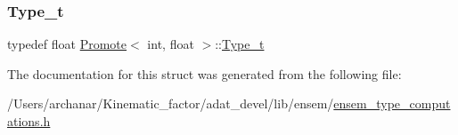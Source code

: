 \subsubsection{\texorpdfstring{Type\_t}{Type\_t}\hspace{0.1cm}{\footnotesize\ttfamily [2/2]}}
{\footnotesize\ttfamily typedef float \mbox{\hyperlink{structPromote}{Promote}}$<$ int, float $>$\+::\mbox{\hyperlink{structPromote_3_01int_00_01float_01_4_a368c812e2854d25d70464511b524bd9e}{Type\+\_\+t}}}



The documentation for this struct was generated from the following file\+:\begin{DoxyCompactItemize}
\item 
/\+Users/archanar/\+Kinematic\+\_\+factor/adat\+\_\+devel/lib/ensem/\mbox{\hyperlink{lib_2ensem_2ensem__type__computations_8h}{ensem\+\_\+type\+\_\+computations.\+h}}\end{DoxyCompactItemize}
